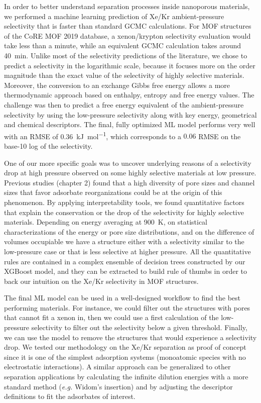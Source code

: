 \documentclass[main]{subfiles}
\begin{document}
In order to better understand separation processes inside nanoporous materials, we performed a machine learning prediction of Xe/Kr ambient-pressure selectivity that is faster than standard GCMC calculations. For MOF structures of the CoRE MOF 2019 database, a xenon/krypton selectivity evaluation would take less than a minute, while an equivalent GCMC calculation takes around \SI{40}{\minute}. Unlike most of the selectivity predictions of the literature, we chose to predict a selectivity in the logarithmic scale, because it focuses more on the order magnitude than the exact value of the selectivity of highly selective materials. Moreover, the conversion to an exchange Gibbs free energy allows a more thermodynamic approach based on enthalpy, entropy and free energy values. The challenge was then to predict a free energy equivalent of the ambient-pressure selectivity by using the low-pressure selectivity along with key energy, geometrical and chemical descriptors. The final, fully optimized ML model performs very well with an RMSE of \SI{0.36}{\kilo\joule\per\mole}, which corresponds to a $0.06$ RMSE on the base-10 log of the selectivity.

One of our more specific goals was to uncover underlying reasons of a selectivity drop at high pressure observed on some highly selective materials at low pressure. Previous studies (chapter 2) found that a high diversity of pore sizes and channel sizes that favor adsorbate reorganizations could be at the origin of this phenomenon. By applying interpretability tools, we found quantitative factors that explain the conservation or the drop of the selectivity for highly selective materials. Depending on energy averaging at \SI{900}{\kelvin}, on statistical characterizations of the energy or pore size distributions, and on the difference of volumes occupiable we have a structure either with a selectivity similar to the low-pressure case or that is less selective at higher pressure. All the quantitative rules are contained in a complex ensemble of decision trees constructed by our XGBoost model, and they can be extracted to build rule of thumbs in order to back our intuition on the Xe/Kr selectivity in MOF structures.

The final ML model can be used in a well-designed workflow to find the best performing materials. For instance, we could filter out the structures with pores that cannot fit a xenon in, then we could use a first calculation of the low-pressure selectivity to filter out the selectivity below a given threshold. Finally, we can use the model to remove the structures that would experience a selectivity drop. We tested our methodology on the Xe/Kr separation as proof of concept since it is one of the simplest adsorption systems (monoatomic species with no electrostatic interactions). A similar approach can be generalized to other separation applications by calculating the infinite dilution energies with a more standard method (\emph{e.g.} Widom's insertion) and by adjusting the descriptor definitions to fit the adsorbates of interest.
\end{document}
